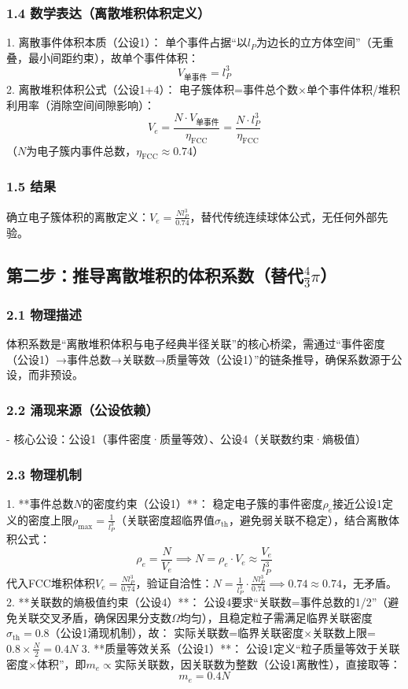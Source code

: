 \documentclass{article}
\begin{document}
\subsubsection{1.4 数学表达（离散堆积体积定义）}
1. 离散事件体积本质（公设1）：  
   单个事件占据“以\(l_P\)为边长的立方体空间”（无重叠，最小间距约束），故单个事件体积：  
   \[
   V_{\text{单事件}} = l_P^3
   \]
2. 离散堆积体积公式（公设1+4）：  
   电子簇体积=事件总个数×单个事件体积/堆积利用率（消除空间间隙影响）：  
   \[
   V_e = \frac{N \cdot V_{\text{单事件}}}{\eta_{\text{FCC}}} = \frac{N \cdot l_P^3}{\eta_{\text{FCC}}}
   \]
   （\(N\)为电子簇内事件总数，\(\eta_{\text{FCC}}≈0.74\)）

\subsubsection{1.5 结果}
确立电子簇体积的离散定义：\(V_e = \frac{N l_P^3}{0.74}\)，替代传统连续球体公式，无任何外部先验。


\subsection{第二步：推导离散堆积的体积系数（替代\(\frac{4}{3}\pi\)）}
\subsubsection{2.1 物理描述}
体积系数是“离散堆积体积与电子经典半径关联”的核心桥梁，需通过“事件密度（公设1）→事件总数→关联数→质量等效（公设1）”的链条推导，确保系数源于公设，而非预设。

\subsubsection{2.2 涌现来源（公设依赖）}
- 核心公设：公设1（事件密度·质量等效）、公设4（关联数约束·熵极值）

\subsubsection{2.3 物理机制}
1. **事件总数\(N\)的密度约束（公设1）**：  
   稳定电子簇的事件密度\(\rho_e\)接近公设1定义的密度上限\(\rho_{\text{max}} = \frac{1}{l_P^3}\)（关联密度超临界值\(\sigma_{\text{th}}\)，避免弱关联不稳定），结合离散体积公式：  
   \[
   \rho_e = \frac{N}{V_e} \implies N = \rho_e \cdot V_e \approx \frac{V_e}{l_P^3}
   \]
   代入FCC堆积体积\(V_e = \frac{N l_P^3}{0.74}\)，验证自洽性：\(N = \frac{1}{l_P^3} \cdot \frac{N l_P^3}{0.74} \implies 0.74≈0.74\)，无矛盾。
2. **关联数的熵极值约束（公设4）**：  
   公设4要求“关联数=事件总数的1/2”（避免关联交叉矛盾，确保因果分支数\(\Omega\)均匀），且稳定粒子需满足临界关联密度\(\sigma_{\text{th}}=0.8\)（公设1涌现机制），故：  
   实际关联数=临界关联密度×关联数上限= \(0.8 \times \frac{N}{2} = 0.4N\)
3. **质量等效关系（公设1）**：  
   公设1定义“粒子质量等效于关联密度×体积”，即\(m_e \propto \text{实际关联数}\)，因关联数为整数（公设1离散性），直接取等：  
   \[
   m_e = 0.4N
   \]
\end{document}
